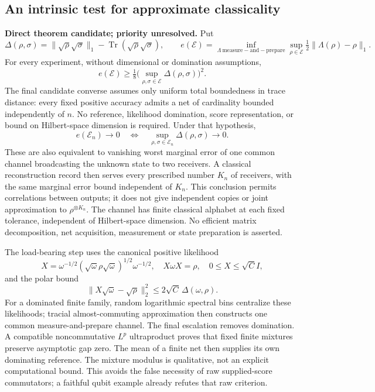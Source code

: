 \documentclass[11pt]{article}
\newcommand{\Tr}{\operatorname{Tr}}
\begin{document}
\subsection{An intrinsic test for approximate classicality}
\textbf{Direct theorem candidate; priority unresolved.} Put
\[
 \Delta(\rho,\sigma)=\|\sqrt\rho\sqrt\sigma\|_1-
             \Tr(\sqrt\rho\sqrt\sigma),\qquad
 e(\mathcal E)=\inf_{\Lambda\ \mathrm{measure\!\!\!-and\!\!\!-prepare}}
       \sup_{\rho\in\mathcal E}\tfrac12\|\Lambda(\rho)-\rho\|_1.
\]
For every experiment, without dimensional or domination assumptions,
\[
 e(\mathcal E)\ge\tfrac18\bigl(\sup_{\rho,\sigma\in\mathcal E}\Delta(\rho,\sigma)\bigr)^2.
\]
The final candidate converse assumes only uniform total boundedness in trace distance: every fixed positive accuracy admits a net of cardinality bounded independently of $n$. No reference, likelihood domination, score representation, or bound on Hilbert-space dimension is required. Under that hypothesis,
\[
e(\mathcal E_n)\longrightarrow0
 \quad\Longleftrightarrow\quad
 \sup_{\rho,\sigma\in\mathcal E_n}\Delta(\rho,\sigma)\longrightarrow0.
\]
These are also equivalent to vanishing worst marginal error of one common channel broadcasting the unknown state to two receivers. A classical reconstruction record then serves every prescribed number $K_n$ of receivers, with the same marginal error bound independent of $K_n$. This conclusion permits correlations between outputs; it does not give independent copies or joint approximation to $\rho^{\otimes K_n}$.
The channel has finite classical alphabet at each fixed tolerance, independent of Hilbert-space dimension. No efficient matrix decomposition, net acquisition, measurement or state preparation is asserted.

The load-bearing step uses the canonical positive likelihood
\[
 X=\omega^{-1/2}(\sqrt\omega\rho\sqrt\omega)^{1/2}\omega^{-1/2},
 \quad X\omega X=\rho,\quad 0\le X\le\sqrt C I,
\]
and the polar bound
\[
 \|X\sqrt\omega-\sqrt\rho\|_2^2\le2\sqrt C\,\Delta(\omega,\rho).
\]
For a dominated finite family, random logarithmic spectral bins centralize these likelihoods; tracial almost-commuting approximation then constructs one common measure-and-prepare channel. The final escalation removes domination. A compatible noncommutative $L^p$ ultraproduct proves that fixed finite mixtures preserve asymptotic gap zero. The mean of a finite net then supplies its own dominating reference. The mixture modulus is qualitative, not an explicit computational bound. This avoids the false necessity of raw supplied-score commutators; a faithful qubit example already refutes that raw criterion.
\end{document}
